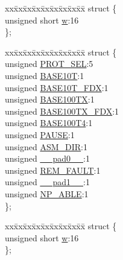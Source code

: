 \begin{DoxyCompactItemize}
\begin{tabbing}
\end{tabbing}\item 
\begin{tabbing}
xx\=xx\=xx\=xx\=xx\=xx\=xx\=xx\=xx\=\kill
struct \{\\
\>unsigned short \hyperlink{union_____a_n_a_dbits__t_a160850a4684a3e82c2323033964f2e98}{w}:16\\
\}; \\

\end{tabbing}\item 
\begin{tabbing}
xx\=xx\=xx\=xx\=xx\=xx\=xx\=xx\=xx\=\kill
struct \{\\
\>unsigned \hyperlink{union_____a_n_a_dbits__t_a05f4c23498c1cea5cfbfbbbc964f044b}{PROT\_SEL}:5\\
\>unsigned \hyperlink{union_____a_n_a_dbits__t_a19e0499585f3d54c98df590edff71b52}{BASE10T}:1\\
\>unsigned \hyperlink{union_____a_n_a_dbits__t_a60f1f5eeed205a15bb647dffff3a2ee3}{BASE10T\_FDX}:1\\
\>unsigned \hyperlink{union_____a_n_a_dbits__t_ad869e01954d2d35cb31bd254c50c44e1}{BASE100TX}:1\\
\>unsigned \hyperlink{union_____a_n_a_dbits__t_a62518f2f0d4bbb7e6f305cf513b7db56}{BASE100TX\_FDX}:1\\
\>unsigned \hyperlink{union_____a_n_a_dbits__t_ae7aa36d7ff2e31c4eb9726c67e04dfea}{BASE100T4}:1\\
\>unsigned \hyperlink{union_____a_n_a_dbits__t_ad4492e8a008bd744e8ee4a73bc202e78}{PAUSE}:1\\
\>unsigned \hyperlink{union_____a_n_a_dbits__t_a9ce4718733bcc9d125f46da36557d868}{ASM\_DIR}:1\\
\>unsigned \hyperlink{union_____a_n_a_dbits__t_adf71f3d8410c1f1dbbc96680a92c49af}{\_\_pad0\_\_}:1\\
\>unsigned \hyperlink{union_____a_n_a_dbits__t_acff720284bf641e0b589ea7feb2d3199}{REM\_FAULT}:1\\
\>unsigned \hyperlink{union_____a_n_a_dbits__t_acaf2d0924a107ec6e8d2e31febaf66f9}{\_\_pad1\_\_}:1\\
\>unsigned \hyperlink{union_____a_n_a_dbits__t_a4502f03b3664f0c1b02bfbfdae50f349}{NP\_ABLE}:1\\
\}; \\

\end{tabbing}\item 
\begin{tabbing}
xx\=xx\=xx\=xx\=xx\=xx\=xx\=xx\=xx\=\kill
struct \{\\
\>unsigned short \hyperlink{union_____a_n_a_dbits__t_a160850a4684a3e82c2323033964f2e98}{w}:16\\
\}; \\

\end{tabbing}\end{DoxyCompactItemize}


